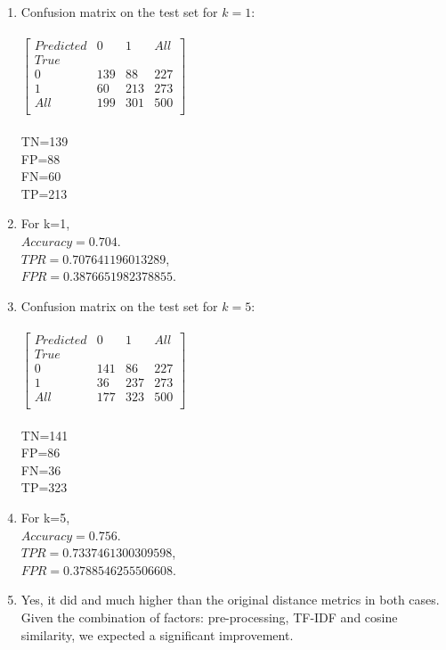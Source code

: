 \documentclass[12pt]{article}
\begin{document}
\begin{enumerate}
\begin{enumerate}
\begin{enumerate}
	 \item Confusion matrix on the test set for $k=1$:\\\\
		$\left[ \begin{array}{cccc}
		Predicted  & 0 & 1 & All \\
		True & & & \\
		0 & 139 & 88 & 227 \\
		1 & 60 & 213 & 273 \\
		All & 199 & 301 & 500 \\		
		\end{array} \right]$\\\\
		TN=139\\FP=88\\FN=60\\TP=213
		\item
		For k=1,\\
		$Accuracy=0.704$.\\
		$TPR = 0.707641196013289$,\\
		$FPR =  0.3876651982378855$.
		
	\item Confusion matrix on the test set for $k=5$:\\\\
		$\left[ \begin{array}{cccc}
		Predicted  & 0 & 1 & All \\
		True & & & \\
		0 & 141 & 86 & 227 \\
		1 & 36 & 237 & 273 \\
		All & 177 & 323 & 500 \\		
		\end{array} \right]$\\\\
		TN=141\\FP=86\\FN=36\\TP=323
		\item
		For k=5,\\
		$Accuracy=0.756$.\\
		$TPR = 0.7337461300309598$,\\
		$FPR =  0.3788546255506608$.
	\item Yes, it did and much higher than the original distance metrics in both cases. Given the combination of factors: pre-processing, TF-IDF and cosine similarity, we expected a significant improvement.

		
	 \end{enumerate}
	\end{enumerate}
	
\end{enumerate}
\end{document}
